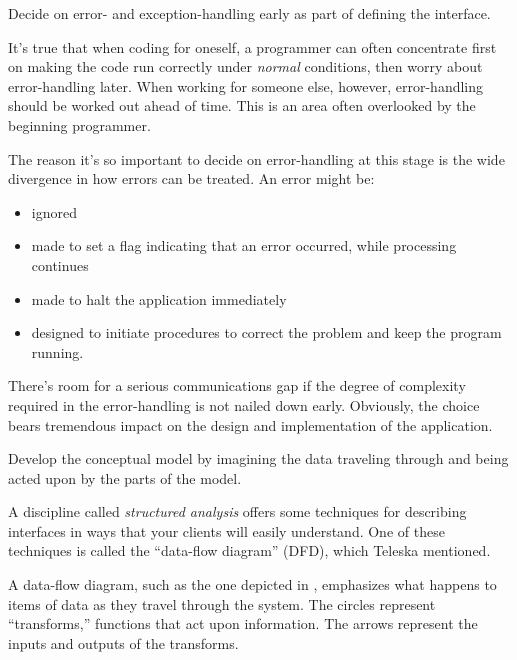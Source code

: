 \begin{tip}
Decide on error- and exception-handling early as part of defining the
interface.
\end{tip}

\noindent It's true that when coding for oneself, a programmer can
often concentrate first on making the code run correctly under
\emph{normal} conditions, then worry about error-handling later. When
working for someone else, however, error-handling should be worked out
ahead of time. This is an area often overlooked by the beginning
programmer.

The reason it's so important to decide on error-handling at this stage
is the wide divergence in how errors can be treated. An error might be:

\begin{itemize}
\item ignored
\item made to set a flag indicating that an error occurred, while processing
continues
\item made to halt the application immediately
\item designed to initiate procedures to correct the problem and keep the
program running.
\end{itemize}


There's room for a serious communications gap if the degree of
complexity required in the error-handling is not nailed down early. Obviously, the
choice bears tremendous impact on the design and implementation of the
application.

\begin{tip}
Develop the conceptual model by imagining the data traveling through and
being acted upon by the parts of the model.
\end{tip}
A discipline called \emph{structured analysis} \cite{weinberg80} offers some
techniques for describing interfaces in ways that your clients will
easily understand.  One of these techniques is called the ``data-flow
diagram'' (DFD), which Teleska mentioned.


A data-flow diagram, such as the one depicted in ,
emphasizes what happens to items of data as they travel through the
system.  The circles represent ``transforms,'' functions that act upon
information.  The arrows represent the inputs and outputs of the
transforms.

